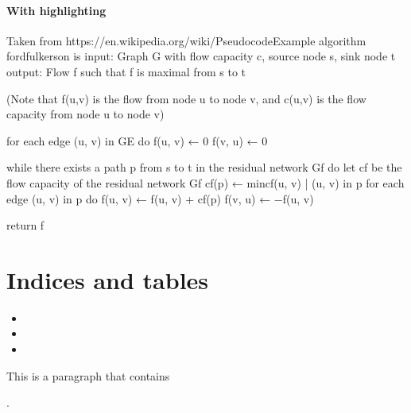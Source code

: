 \documentclass[a4paper,10pt,english]{sphinxmanual}
\begin{document}
\subsubsection{With  highlighting}
\label{\detokenize{test1:with-none-highlighting}}
\begin{sphinxVerbatim}[commandchars=\\\{\}]
\PYGZsh{} Taken from https://en.wikipedia.org/wiki/Pseudocode\PYGZsh{}Example
algorithm ford\PYGZhy{}fulkerson is
    input: Graph G with flow capacity c,
        source node s,
        sink node t
    output: Flow f such that f is maximal from s to t

    (Note that f(u,v) is the flow from node u to node v, and c(u,v) is the flow capacity from node u to node v)

    for each edge (u, v) in GE do
        f(u, v) ← 0
        f(v, u) ← 0

    while there exists a path p from s to t in the residual network Gf do
        let cf be the flow capacity of the residual network Gf
        cf(p) ← min\PYGZob{}cf(u, v) | (u, v) in p\PYGZcb{}
        for each edge (u, v) in p do
            f(u, v) ←  f(u, v) + cf(p)
            f(v, u) ← −f(u, v)

    return f
\end{sphinxVerbatim}

\begin{figure}[htbp]
\centering

\noindent{}
\end{figure}


\chapter{Indices and tables}
\label{\detokenize{index:indices-and-tables}}\begin{itemize}
\item {} 
\sphinxAtStartPar
{}

\item {} 
\sphinxAtStartPar
{}

\item {} 
\sphinxAtStartPar
{}

\end{itemize}

\sphinxAtStartPar
This is a paragraph that contains %
\begin{footnote}[1]\sphinxAtStartFootnote
{}
%
\end{footnote}.



\renewcommand{\indexname}{Index}
\printindex
\end{document}
